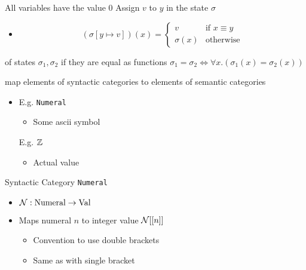 \begin{itemize}
\begin{itemize}
\begin{itemize}
\begin{itemize}
                        \end{itemize}
                     All variables have the value $0$
                     Assign $v$ to $y$ in the state $\sigma$
                        \begin{itemize}
                            \item
                                \[
                                    (\sigma[y \mapsto v])(x) =
\begin{cases}
    v  & \text{if } x \equiv y\\
    \sigma(x) & \text{otherwise}
\end{cases}
                                \]
                        \end{itemize}
                     of states $\sigma_1, \sigma_2$ if they are equal as functions $\sigma_1 = \sigma_2 \iff \forall x. (\sigma_1(x) = \sigma_2(x))$
                \end{itemize}
             map elements of syntactic categories to elements of semantic categories
                \begin{itemize}
                    \item
                     E.g. \verb+Numeral+
                        \begin{itemize}
                            \item Some ascii symbol
                        \end{itemize}
                     E.g. $\mathbb{Z}$
                        \begin{itemize}
                            \item Actual value
                        \end{itemize}
                \end{itemize}
             Syntactic Category \verb+Numeral+
                \begin{itemize}
                    \item $\mathcal{N}: \text{Numeral} \to \text{Val}$
                    \item Maps numeral $n$ to integer value $\mathcal N[[n]]$
                        \begin{itemize}
                            \item Convention to use double brackets
                            \item Same as with single bracket

\end{itemize}
\end{itemize}
\end{itemize}
\end{itemize}

